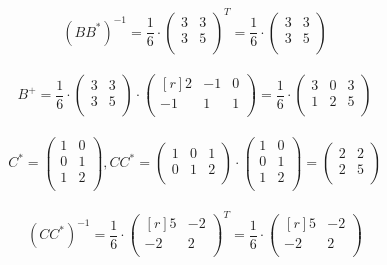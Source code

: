 \documentclass[12pt]{article}
\theoremstyle{definition}
\numberwithin{equation}{section}
\begin{document}
\[(BB^*)^{-1} = \frac{1}{6} \cdot \begin{pmatrix}
3 & 3 \\         
3 & 5 \\
\end{pmatrix}^T = \frac{1}{6} \cdot \begin{pmatrix}
3 & 3 \\         
3 & 5 \\
\end{pmatrix}\]\\
\[B^+ = \frac{1}{6} \cdot \begin{pmatrix}
3 & 3 \\         
3 & 5 \\
\end{pmatrix} \cdot \begin{pmatrix}[r]
2 & -1 & 0 \\         
-1 & 1 & 1 \\
\end{pmatrix} = \frac{1}{6} \cdot \begin{pmatrix}
3 & 0 & 3 \\         
1 & 2 & 5 \\
\end{pmatrix}\]\\
\[C^* = \begin{pmatrix}
1 & 0 \\         
0 & 1 \\
1 & 2 \\
\end{pmatrix}, CC^* = \begin{pmatrix}
1 & 0 & 1 \\         
0 & 1 & 2 \\
\end{pmatrix} \cdot \begin{pmatrix}
1 & 0 \\         
0 & 1 \\
1 & 2 \\
\end{pmatrix} = \begin{pmatrix}
2 & 2 \\         
2 & 5 \\
\end{pmatrix}\]\\
\[(CC^*)^{-1} = \frac{1}{6} \cdot \begin{pmatrix}[r]
5 & -2 \\         
-2 & 2 \\
\end{pmatrix}^T = \frac{1}{6} \cdot \begin{pmatrix}[r]
5 & -2 \\         
-2 & 2 \\
\end{pmatrix}\]\\
\end{document}
